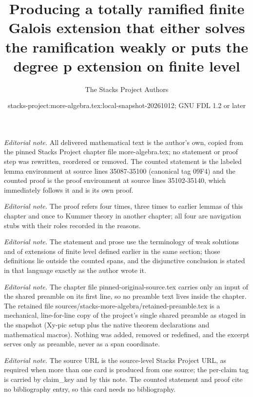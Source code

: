 \documentclass[10pt,a4paper]{amsart}
\title{Producing a totally ramified finite Galois extension that either solves the ramification weakly or puts the degree p extension on finite level}
\author{The Stacks Project Authors}
\date{stacks-project:more-algebra.tex:local-snapshot-20261012; GNU FDL 1.2 or later}
\theoremstyle{plain}
\theoremstyle{definition}
\theoremstyle{remark}
\numberwithin{equation}{subsection}
\begin{document}
\maketitle
\setcounter{subsection}{1}
\noindent\textit{Editorial note.} All delivered mathematical text is the author's own, copied from the pinned Stacks Project chapter file more-algebra.tex; no statement or proof step was rewritten, reordered or removed. The counted statement is the labeled lemma environment at source lines 35087-35100 (canonical tag 09F4) and the counted proof is the proof environment at source lines 35102-35140, which immediately follows it and is its own proof.\par\medskip
\noindent\textit{Editorial note.} The proof refers four times, three times to earlier lemmas of this chapter and once to Kummer theory in another chapter; all four are navigation stubs with their roles recorded in the reasons.\par\medskip
\noindent\textit{Editorial note.} The statement and prose use the terminology of weak solutions and of extensions of finite level defined earlier in the same section; those definitions lie outside the counted spans, and the disjunctive conclusion is stated in that language exactly as the author wrote it.\par\medskip
\noindent\textit{Editorial note.} The chapter file pinned-original-source.tex carries only an input of the shared preamble on its first line, so no preamble text lives inside the chapter. The retained file sources/stacks-more-algebra/retained-preamble.tex is a mechanical, line-for-line copy of the project's single shared preamble as staged in the snapshot (Xy-pic setup plus the native theorem declarations and mathematical macros). Nothing was added, removed or redefined, and the excerpt serves only as preamble, never as a span coordinate.\par\medskip
\noindent\textit{Editorial note.} The source URL is the source-level Stacks Project URL, as required when more than one card is produced from one source; the per-claim tag is carried by claim\_key and by this note. The counted statement and proof cite no bibliography entry, so this card needs no bibliography.\par\medskip
\end{document}
